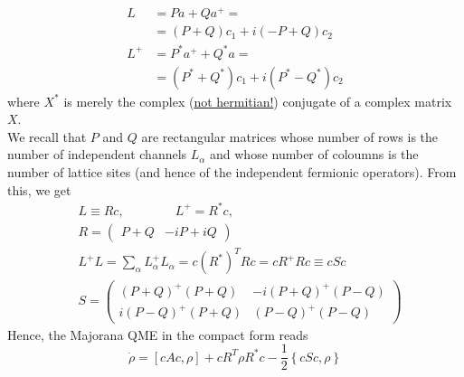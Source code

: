\documentclass[a4paper,11pt]{article}
\newcommand{\ro}{\rho}
\newcommand{\nl}{\vskip 0.3cm}
\newcommand{\np}{\vskip 1.3cm}
\newcommand{\ubar}[1]{\underline{#1}}
\begin{document}
    \begin{align*}
   L &= P a + Q a^+=\\
     &= (P+Q)c_1 +i(-P+Q)c_2\\
   L^+&= P^*a^++Q^*a=\\
     &= (P^*+Q^*)c_1+i(P^*-Q^*)c_2  
    \end{align*}  
   where $X^*$ is merely the complex (\ubar{not hermitian!}) conjugate of a complex matrix $X$. \\We recall that $P$ and $Q$ are rectangular matrices whose number of rows is the number of independent channels $L_{\alpha}$ and whose number of coloumns is the number of lattice sites (and hence of the independent fermionic operators). From this, we get
  \begin{subequations}
  \label{eq:quadr_lindb_majorana}
  \begin{align}
      &L    \equiv Rc, \quad \quad \quad \quad  L^+  = R^*c,\\
      &R = \left(\begin{array}{cc} P+Q & -iP+iQ\end{array}\right) \\[0.3cm]
      &L^+L = \sum_{\alpha} L^+_{\alpha}L^{ }_{\alpha} = c(R^*)^TRc = cR^+Rc \equiv cSc \\
      &S =\left(\begin{array}{cc} (P+Q)^+(P+Q) & -i(P+Q)^+(P-Q)\\i(P-Q)^+(P+Q)&(P-Q)^+(P-Q) \end{array}\right)
  \end{align} 
  \end{subequations}
  \nl Hence, the Majorana QME in the compact form reads
  \begin{equation}
   \label{eq:quadr_dyn_majorana}
   \dot{\ro}=\left[cAc,\ro\right]+cR^T\ro R^*c - \frac{1}{2}\left\{cSc,\ro\right\}
  \end{equation}
  \np
  
\end{document}
